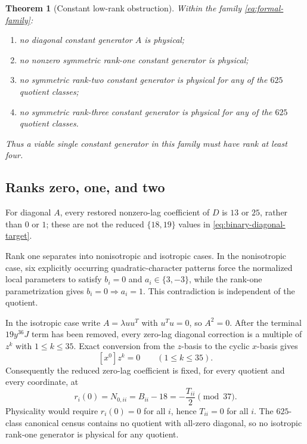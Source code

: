 \documentclass[11pt]{article}
\newtheorem{theorem}{Theorem}[section]
\theoremstyle{definition}
\begin{document}
\begin{theorem}[Constant low-rank obstruction]
\label{thm:constant-low-rank}
Within the family \eqref{eq:formal-family}:
\begin{enumerate}[label=(\alph*)]
\item no diagonal constant generator \(A\) is physical;
\item no nonzero symmetric rank-one constant generator is physical;
\item no symmetric rank-two constant generator is physical for any of the
\(625\) quotient classes;
\item no symmetric rank-three constant generator is physical for any of
the \(625\) quotient classes.
\end{enumerate}
Thus a viable single constant generator in this family must have rank at
least four.
\end{theorem}

\subsection{Ranks zero, one, and two}

For diagonal \(A\), every restored nonzero-lag coefficient of \(D\) is
\(13\) or \(25\), rather than \(0\) or \(1\); these are not the reduced
\(\{18,19\}\) values in \eqref{eq:binary-diagonal-target}.

Rank one separates into nonisotropic and isotropic cases.  In the
nonisotropic case, six explicitly occurring quadratic-character patterns
force the normalized local parameters to satisfy \(b_i=0\) and
\(a_i\in\{3,-3\}\), while the rank-one parametrization gives
\(b_i=0\Rightarrow a_i=1\).  This contradiction is independent of the
quotient.

In the isotropic case write \(A=\lambda uu^T\) with \(u^Tu=0\), so
\(A^2=0\).  After the terminal \(19y^{36}J\) term has been removed, every
zero-lag diagonal correction is a multiple of \(z^k\) with
\(1\leq k\leq35\).  Exact conversion from the \(z\)-basis to the cyclic
\(x\)-basis gives
\[
 [x^0]z^k=0\qquad(1\leq k\leq35).
\]
Consequently the reduced zero-lag coefficient is fixed, for every
quotient and every coordinate, at
\[
 r_i(0)=N_{0,ii}=B_{ii}-18=-\frac{T_{ii}}2\pmod{37}.
\]
Physicality would require \(r_i(0)=0\) for all \(i\), hence
\(T_{ii}=0\) for all \(i\).  The \(625\)-class canonical census contains
no quotient with all-zero diagonal, so no isotropic rank-one generator is
physical for any quotient.
\end{document}
